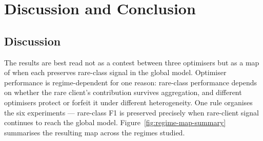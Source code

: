 \documentclass[11pt,a4paper]{report}
\begin{document}










\chapter{Discussion and Conclusion}
\label{ch:discussion}

\section{Discussion}
\label{sec:disc}

The results are best read not as a contest between three optimisers but as a map
of when each preserves rare-class signal in the global model. Optimiser
performance is regime-dependent for one reason: rare-class performance depends on
whether the rare client's contribution survives aggregation, and different
optimisers protect or forfeit it under different heterogeneity. One rule organises
the six experiments --- rare-class F1 is preserved precisely when rare-client
signal continues to reach the global model. Figure~\ref{fig:regime-map-summary}
summarises the resulting map across the regimes studied.
\end{document}
